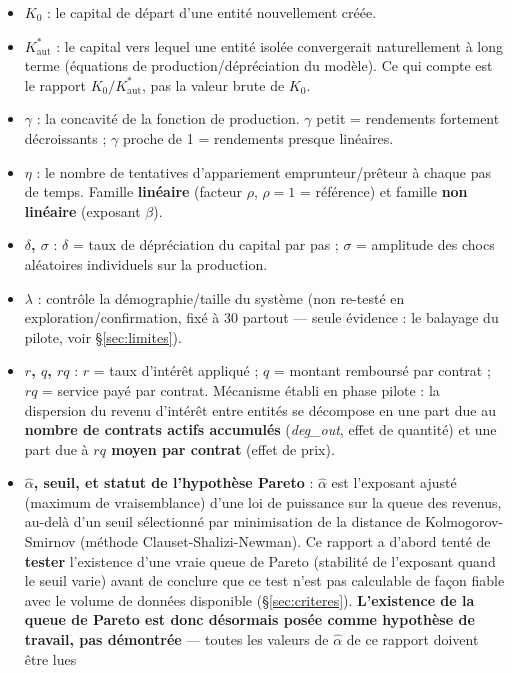 \documentclass[11pt,a4paper]{article}
\newcommand{\Kaut}{K^{*}_{\mathrm{aut}}}
\begin{document}
\begin{itemize}
\item \textbf{$K_0$} : le capital de départ d'une entité nouvellement créée.
\item \textbf{$\Kaut$} : le capital vers lequel une entité isolée
  convergerait naturellement à long terme (équations de
  production/dépréciation du modèle). Ce qui compte est le rapport
  $K_0/\Kaut$, pas la valeur brute de $K_0$.
\item \textbf{$\gamma$} : la concavité de la fonction de production.
  $\gamma$ petit = rendements fortement décroissants ; $\gamma$ proche de
  1 = rendements presque linéaires.
\item \textbf{$\eta$} : le nombre de tentatives d'appariement
  emprunteur/prêteur à chaque pas de temps. Famille \textbf{linéaire}
  (facteur $\rho$, $\rho=1$ = référence) et famille \textbf{non
  linéaire} (exposant $\beta$).
\item \textbf{$\delta$, $\sigma$} : $\delta$ = taux de dépréciation du
  capital par pas ; $\sigma$ = amplitude des chocs aléatoires
  individuels sur la production.
\item \textbf{$\lambda$} : contrôle la démographie/taille du système
  (non re-testé en exploration/confirmation, fixé à 30 partout --- seule
  évidence : le balayage du pilote, voir \S\ref{sec:limites}).
\item \textbf{$r$, $q$, $rq$} : $r$ = taux d'intérêt appliqué ; $q$ =
  montant remboursé par contrat ; $rq$ = service payé par contrat.
  Mécanisme établi en phase pilote : la dispersion du revenu d'intérêt
  entre entités se décompose en une part due au \textbf{nombre de
  contrats actifs accumulés} (\emph{deg\_out}, effet de quantité) et une
  part due à \textbf{$rq$ moyen par contrat} (effet de prix).
\item \textbf{$\hat\alpha$, seuil, et statut de l'hypothèse Pareto} :
  $\hat\alpha$ est l'exposant ajusté (maximum de vraisemblance) d'une
  loi de puissance sur la queue des revenus, au-delà d'un seuil
  sélectionné par minimisation de la distance de Kolmogorov-Smirnov
  (méthode Clauset-Shalizi-Newman). Ce rapport a d'abord tenté de
  \textbf{tester} l'existence d'une vraie queue de Pareto (stabilité de
  l'exposant quand le seuil varie) avant de conclure que ce test n'est
  pas calculable de façon fiable avec le volume de données disponible
  (\S\ref{sec:criteres}). \textbf{L'existence de la queue de Pareto est
  donc désormais posée comme hypothèse de travail, pas démontrée} ---
  toutes les valeurs de $\hat\alpha$ de ce rapport doivent être lues

\end{itemize}
\end{document}
